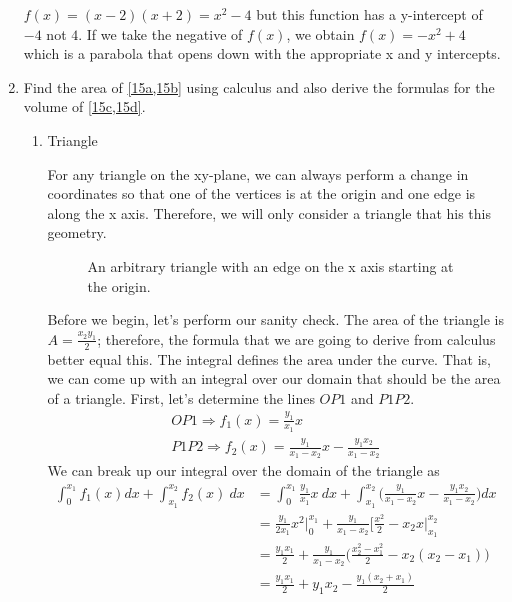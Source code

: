 \begin{enumerate}
  \(f(x) = (x - 2)(x + 2) = x^2 - 4\) but this function has a y-intercept of
  \(-4\) not \(4\).
  If we take the negative of \(f(x)\), we obtain \(f(x) = -x^2 + 4\) which is a
  parabola that opens down with the appropriate x and y intercepts.
\item
  Find the area of \cref{15a,15b} using calculus and also derive the formulas for
  the volume of \cref{15c,15d}.
  \begin{enumerate}[label = (\alph*), ref = \theenumi{(\alph*)}]
  \item
    \label{15a}
    Triangle
    \par\smallskip
    For any triangle on the xy-plane, we can always perform a change in
    coordinates so that one of the vertices is at the origin and one edge is
    along the x axis.
    Therefore, we will only consider a triangle that his this geometry.
    \begin{figure}[H]
      \centering
      
      \caption{An arbitrary triangle with an edge on the x axis starting at
        the origin.}
    \end{figure}
    Before we begin, let's perform our sanity check.
    The area of the triangle is \(A = \frac{x_2y_1}{2}\); therefore, the formula
    that we are going to derive from calculus better equal this.
    The integral defines the area under the curve.
    That is, we can come up with an integral over our domain that should be the
    area of a triangle.
    First, let's determine the lines \(OP1\) and \(P1P2\).
    \begin{gather*}
      OP1 \Rightarrow f_1(x) = \frac{y_1}{x_1}x\\
      P1P2 \Rightarrow f_2(x) = \frac{y_1}{x_1 - x_2}x -
      \frac{y_1x_2}{x_1 - x_2}
    \end{gather*}
    We can break up our integral over the domain of the triangle as
    \begin{align*}
      \int_0^{x_1}f_1(x)dx + \int_{x_1}^{x_2}f_2(x) \ dx
      &= \int_0^{x_1}\frac{y_1}{x_1}x \ dx + \int_{x_1}^{x_2}\bigg(
        \frac{y_1}{x_1 - x_2}x - \frac{y_1x_2}{x_1 - x_2}\bigg)dx\\
      &= \frac{y_1}{2x_1}x^2\bigg|_0^{x_1} + \frac{y_1}{x_1 - x_2}
         \bigg[\frac{x^2}{2} - x_2x\bigg|_{x_1}^{x_2}\\
      &= \frac{y_1x_1}{2} + \frac{y_1}{x_1 - x_2}\bigg(\frac{x_2^2 - x_1^2}{2}
         - x_2(x_2 - x_1)\bigg)\\
      &= \frac{y_1x_1}{2} + y_1x_2 - \frac{y_1(x_2 + x_1)}{2}\\

\end{align*}
\end{enumerate}
\end{enumerate}
